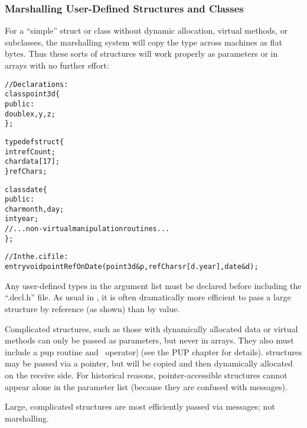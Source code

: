 \subsubsection{Marshalling User-Defined Structures and Classes}

For a ``simple'' struct or class without dynamic allocation,
virtual methods, or subclasses, the marshalling system will
copy the type across machines as flat bytes.  Thus these sorts
of structures will work properly as parameters or in arrays
with no further effort:

\begin{alltt}
//Declarations:
class point3d \{
public:
    double x,y,z;    
\};

typedef struct \{
    int refCount;
    char data[17];
\} refChars;

class date \{
public:
    char month,day;
    int year;
    //...non-virtual manipulation routines...
\};

//In the .ci file:
    entry void pointRefOnDate(point3d &p,refChars r[d.year],date &d);
\end{alltt}

Any user-defined types in the argument list must be declared 
before including the ``.decl.h'' file.
As usual in \CC, it is often dramatically more efficient to pass
a large structure by reference (as shown) than by value.

Complicated structures, such as those with dynamically
allocated data or virtual methods can only be passed as
parameters, but never in arrays.  They also must include a pup
routine and \CC\ operator| (see the PUP chapter for details).
 structures may be passed via a pointer,
but will be copied and then dynamically allocated on the receive side.
For historical reasons, pointer-accessible structures cannot appear 
alone in the parameter list (because they are confused with messages).

Large, complicated structures are most efficiently passed 
via messages; not marshalling.
